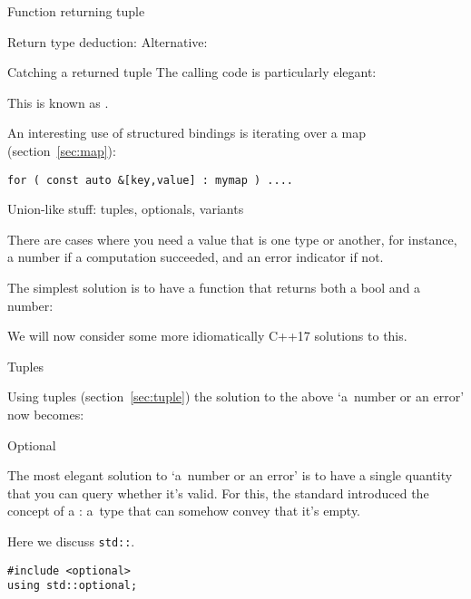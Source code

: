 \begin{slide}{Function returning tuple}
  \label{sl:tuplefun}
  \begin{multicols}{2}
    Return type deduction:
    \columnbreak
    Alternative:
  \end{multicols}
\end{slide}

\begin{block}{Catching a returned tuple}
  \label{sl:catch-tuple}
  The calling code is particularly elegant:

  This is known as .
\end{block}

An interesting use of structured bindings is iterating over a map (section~\ref{sec:map}):
\begin{lstlisting}
for ( const auto &[key,value] : mymap ) ....
\end{lstlisting}

 {Union-like stuff: tuples, optionals, variants}

There are cases where you need a value that is one type or another,
for instance, a number if a computation succeeded, and an error
indicator if not.

The simplest solution is to have a function that returns both a bool
and a number:
%

We will now consider some more idiomatically C++17 solutions to this.

 {Tuples}

Using tuples (section~\ref{sec:tuple}) 
the solution to the above `a~number or an error' now becomes:
%

 {Optional}
\label{sec:std-optional}

The most elegant solution to `a~number or an error' is to have a
single quantity that you can query whether it's valid.
For this, the
 standard
introduced the concept of a :
a~type that can somehow convey that it's empty.

Here we discuss \lstinline{std::}.

\begin{lstlisting}
#include <optional>
using std::optional;
\end{lstlisting}

